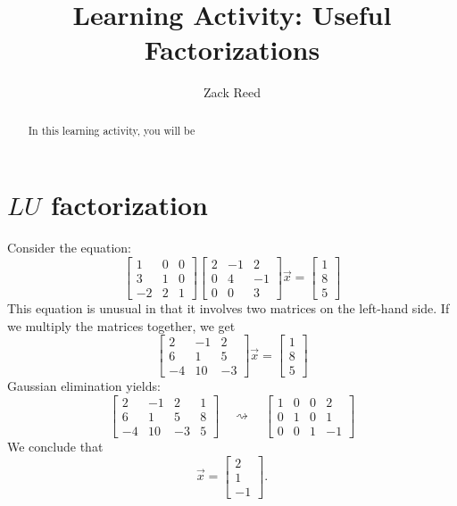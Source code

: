 \documentclass{ximera}
\author{Zack Reed}
\title{Learning Activity: Useful Factorizations} \license{CC BY-NC-SA 4.0}
\begin{document}
\begin{abstract}

    In this learning activity, you will be 
\end{abstract}
\maketitle
 

\section*{$LU$ factorization}

 
\begin{exploration}\label{init:LUfactorization}
Consider the equation:
$$\begin{bmatrix}1&0&0\\3&1&0\\-2&2&1\end{bmatrix}\begin{bmatrix}2&-1&2\\0&4&-1\\0&0&3\end{bmatrix}\vec{x}=\begin{bmatrix}1\\8\\5\end{bmatrix}$$
This equation is unusual in that it involves two matrices on the left-hand side.  If we multiply the matrices together, we get
$$\begin{bmatrix}2&-1&2\\6&1&5\\-4&10&-3\end{bmatrix}\vec{x}=\begin{bmatrix}1\\8\\5\end{bmatrix}$$
Gaussian elimination yields:
$$\left[\begin{array}{ccc|c}
2&-1&2&1\\6&1&5&8\\-4&10&-3&5
\end{array}\right]
\quad\rightsquigarrow\quad
\left[\begin{array}{ccc|c}
 1&0&0&2\\0&1&0&1\\0&0&1&-1
\end{array}\right]
$$
We conclude that
$$\vec{x}=\begin{bmatrix}2\\1\\-1\end{bmatrix}.$$
 

\end{exploration}
\end{document}
